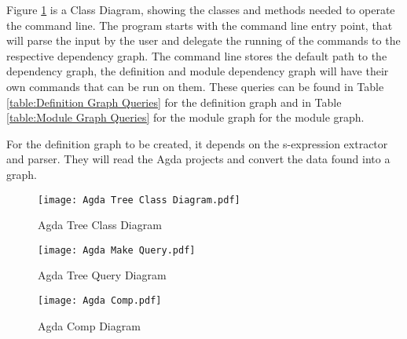 \begin{minipage}{\linewidth\fboxsep\fboxrule}

Figure \ref{fig:Agda Tree Class Diagram} is a Class Diagram, showing the
classes and methods needed to operate the command line. The program starts with
the command line entry point, that will parse the input by the user and
delegate the running of the commands to the respective dependency graph. The
command line stores the default path to the dependency graph, the definition
and module dependency graph will have their own commands that can be run on
them. These queries can be found in Table \ref{table:Definition Graph Queries}
for the definition graph and in Table \ref{table:Module Graph Queries} for the
module graph for the module graph.

For the definition graph to be created, it depends on the s-expression
extractor and parser. They will read the Agda projects and convert the data
found into a graph.

\begin{figure}[H]
    \centering
    \label{fig:Agda Tree Class Diagram}
    \texttt{[image: Agda Tree Class Diagram.pdf]}
    \caption{Agda Tree Class Diagram}
\end{figure} 
    
\end{minipage}

\begin{figure}
    \centering
    \label{fig:Agda Tree Query Diagram}
    \texttt{[image: Agda Make Query.pdf]}
    \caption{Agda Tree Query Diagram}
\end{figure} 

\begin{figure}
    \centering 
    \label{fig:Agda Comp Diagram}
    \texttt{[image: Agda Comp.pdf]}
    \caption{Agda Comp Diagram}
\end{figure} 

%
